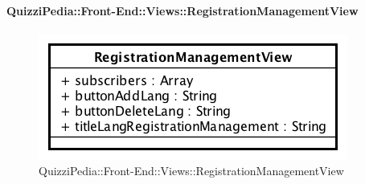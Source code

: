 \paragraph{QuizziPedia::Front-End::Views::RegistrationManagementView}
\begin{figure} [ht]
	\centering
	\includegraphics[scale=0.80]{UML/Classi/Front-End/QuizziPedia_Front-end_Views_RegistrationManagementView.png}
	\caption{QuizziPedia::Front-End::Views::RegistrationManagementView}
\end{figure} \FloatBarrier
